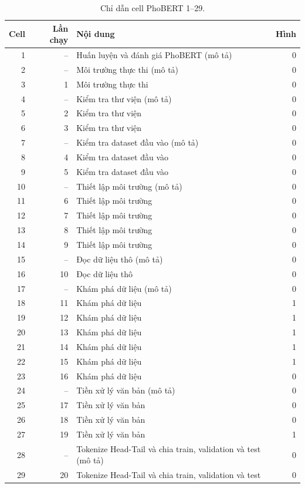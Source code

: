 \begin{table}[H]\centering\small\caption{Chỉ dẫn cell PhoBERT 1--29.}
\begin{tabular}{r r p{87mm} r}\toprule Cell & Lần chạy & Nội dung & Hình\\\midrule
1 & -- & Huấn luyện và đánh giá PhoBERT (mô tả) & 0\\
2 & -- & Môi trường thực thi (mô tả) & 0\\
3 & 1 & Môi trường thực thi & 0\\
4 & -- & Kiểm tra thư viện (mô tả) & 0\\
5 & 2 & Kiểm tra thư viện & 0\\
6 & 3 & Kiểm tra thư viện & 0\\
7 & -- & Kiểm tra dataset đầu vào (mô tả) & 0\\
8 & 4 & Kiểm tra dataset đầu vào & 0\\
9 & 5 & Kiểm tra dataset đầu vào & 0\\
10 & -- & Thiết lập môi trường (mô tả) & 0\\
11 & 6 & Thiết lập môi trường & 0\\
12 & 7 & Thiết lập môi trường & 0\\
13 & 8 & Thiết lập môi trường & 0\\
14 & 9 & Thiết lập môi trường & 0\\
15 & -- & Đọc dữ liệu thô (mô tả) & 0\\
16 & 10 & Đọc dữ liệu thô & 0\\
17 & -- & Khám phá dữ liệu (mô tả) & 0\\
18 & 11 & Khám phá dữ liệu & 1\\
19 & 12 & Khám phá dữ liệu & 1\\
20 & 13 & Khám phá dữ liệu & 1\\
21 & 14 & Khám phá dữ liệu & 1\\
22 & 15 & Khám phá dữ liệu & 1\\
23 & 16 & Khám phá dữ liệu & 0\\
24 & -- & Tiền xử lý văn bản (mô tả) & 0\\
25 & 17 & Tiền xử lý văn bản & 0\\
26 & 18 & Tiền xử lý văn bản & 0\\
27 & 19 & Tiền xử lý văn bản & 1\\
28 & -- & Tokenize Head-Tail và chia train, validation và test (mô tả) & 0\\
29 & 20 & Tokenize Head-Tail và chia train, validation và test & 0\\
\bottomrule\end{tabular}\end{table}
